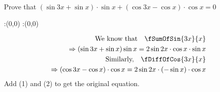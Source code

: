 

\question[3] Prove that $\left( \sin 3x + \sin x\right)\cdot \sin x + \left(\cos 3x - \cos x \right)\cdot\cos x = 0 $


\ifprintanswers
  \begin{marginfigure}
      :(0,0)
      :(0,0)
    \figdrawbegin{}
      \figdrawline [100,101]
    \figdrawend
    \figvisu{\figBoxA}{}{%
    }
    \centerline{\box\figBoxA}
  \end{marginfigure}
\fi 

\begin{solution}[\halfpage]
	\begin{align}
	    \text{We know that}\quad
		\fSumOfSin{3x}{x} \nonumber \\
		\Rightarrow (\sin 3x + \sin x)\sin x 
			= 2\sin{2x}\cdot\cos{x}\cdot\sin{x}\\
	    \text{Similarly,}\quad
		\fDiffOfCos{3x}{x} \nonumber \\
		\Rightarrow (\cos 3x-\cos x)\cdot\cos x 
			= 2\sin{2x}\cdot(-\sin x)\cdot\cos x
	\end{align}
	Add (1) and (2) to get the original equation.
\end{solution}
